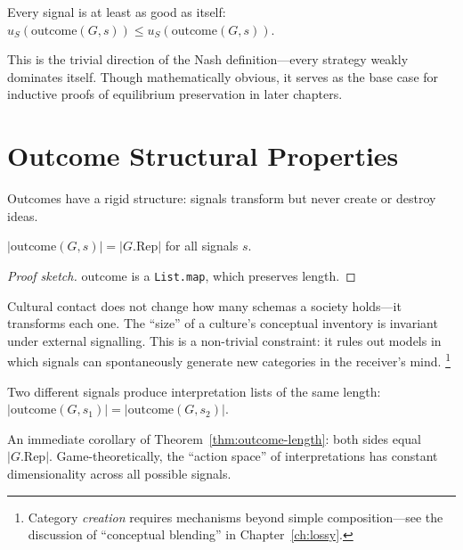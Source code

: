 \begin{theorem}
\label{thm:equilibrium-refl}
Every signal is at least as good as itself:
$u_S(\mathrm{outcome}(G,s)) \le u_S(\mathrm{outcome}(G,s))$.
\end{theorem}

This is the trivial direction of the Nash definition---every strategy weakly
dominates itself.  Though mathematically obvious, it serves as the base case
for inductive proofs of equilibrium preservation in later chapters.


\section{Outcome Structural Properties}
\label{sec:eq-structure}

Outcomes have a rigid structure: signals transform but never create or
destroy ideas.

\begin{theorem}
\label{thm:outcome-length}
$|\mathrm{outcome}(G, s)| = |G.\mathrm{Rep}|$ for all signals $s$.
\end{theorem}

\begin{proof}[Proof sketch]
$\mathrm{outcome}$ is a \texttt{List.map}, which preserves length.
\end{proof}

Cultural contact does not change how many schemas a society holds---it
transforms each one.  The ``size'' of a culture's conceptual inventory is
invariant under external signalling.  This is a non-trivial constraint: it
rules out models in which signals can spontaneously generate new categories
in the receiver's mind.%
\footnote{Category \emph{creation} requires mechanisms beyond simple
composition---see the discussion of ``conceptual blending'' in
Chapter~\ref{ch:lossy}.}

\begin{theorem}
\label{thm:outcome-length-eq}
Two different signals produce interpretation lists of the same length:
$|\mathrm{outcome}(G, s_1)| = |\mathrm{outcome}(G, s_2)|$.
\end{theorem}

An immediate corollary of Theorem~\ref{thm:outcome-length}: both sides
equal $|G.\mathrm{Rep}|$.  Game-theoretically, the ``action space'' of
interpretations has constant dimensionality across all possible signals.


